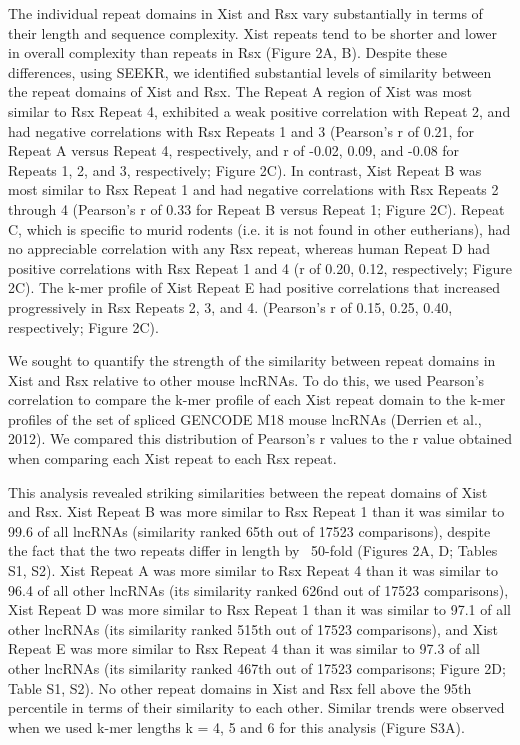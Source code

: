 The individual repeat domains in Xist and Rsx vary substantially in terms of their length and sequence complexity. Xist repeats tend to be shorter and lower in overall complexity than repeats in Rsx (Figure 2A, B). Despite these differences, using SEEKR, we identified substantial levels of similarity between the repeat domains of Xist and Rsx. The Repeat A region of Xist was most similar to Rsx Repeat 4, exhibited a weak positive correlation with Repeat 2, and had negative correlations with Rsx Repeats 1 and 3 (Pearson’s r of 0.21, for Repeat A versus Repeat 4, respectively, and r of -0.02, 0.09, and -0.08 for Repeats 1, 2, and 3, respectively; Figure 2C). In contrast, Xist Repeat B was most similar to Rsx Repeat 1 and had negative correlations with Rsx Repeats 2 through 4 (Pearson’s r of 0.33 for Repeat B versus Repeat 1; Figure 2C). Repeat C, which is specific to murid rodents (i.e. it is not found in other eutherians), had no appreciable correlation with any Rsx repeat, whereas human Repeat D had positive correlations with Rsx Repeat 1 and 4 (r of 0.20, 0.12, respectively; Figure 2C). The k-mer profile of Xist Repeat E had positive correlations that increased progressively in Rsx Repeats 2, 3, and 4. (Pearson’s r of 0.15, 0.25, 0.40, respectively; Figure 2C). 

We sought to quantify the strength of the similarity between repeat domains in Xist and Rsx relative to other mouse lncRNAs. To do this, we used Pearson’s correlation to compare the k-mer profile of each Xist repeat domain to the k-mer profiles of the set of spliced GENCODE M18 mouse lncRNAs (Derrien et al., 2012). We compared this distribution of Pearson’s r values to the r value obtained when comparing each Xist repeat to each Rsx repeat. 

This analysis revealed striking similarities between the repeat domains of Xist and Rsx. Xist Repeat B was more similar to Rsx Repeat 1 than it was similar to 99.6 of all lncRNAs (similarity ranked 65th out of 17523 comparisons), despite the fact that the two repeats differ in length by ~50-fold (Figures 2A, D; Tables S1, S2). Xist Repeat A was more similar to Rsx Repeat 4 than it was similar to 96.4 of all other lncRNAs (its similarity ranked 626nd out of 17523 comparisons), Xist Repeat D was more similar to Rsx Repeat 1 than it was similar to 97.1 of all other lncRNAs (its similarity ranked 515th out of 17523 comparisons), and Xist Repeat E was more similar to Rsx Repeat 4 than it was similar to 97.3 of all other lncRNAs (its similarity ranked 467th out of 17523 comparisons; Figure 2D; Table S1, S2). No other repeat domains in Xist and Rsx fell above the 95th percentile in terms of their similarity to each other. Similar trends were observed when we used k-mer lengths k = 4, 5 and 6 for this analysis (Figure S3A). 

